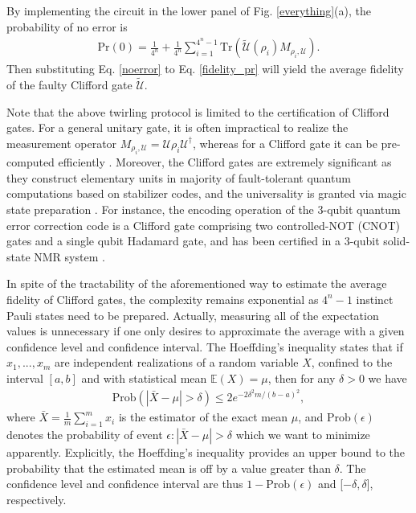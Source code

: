 \documentclass[prl,twocolumn,showpacs]{revtex4-1}
\begin{document}
By implementing the circuit in the lower panel of Fig. \ref{everything}(a), the probability of no error is \cite{Alex2013}
\begin{align} \label{noerror}
\text{Pr}(0) = \frac{1}{4^n} + \frac{1}{4^n}\sum_{i=1}^{4^n-1} \text{Tr}\left( \tilde{\mathcal{U}} \left( \rho_{i}\right) M_{\rho_i, \mathcal{U}}\right).
\end{align}
Then substituting Eq. \ref{noerror} to Eq. \ref{fidelity_pr} will yield the average fidelity of the faulty Clifford gate $\tilde{\mathcal{U}}$.

Note that the above twirling protocol is limited to the certification of Clifford gates. For a general unitary gate, it is often impractical to realize the measurement operator $M_{\rho_i, \mathcal{U}} = \mathcal{U} \rho_{i} \mathcal{U}^{\dagger}$, whereas for a Clifford gate it can be pre-computed efficiently \cite{Aaronson2004}. Moreover, the Clifford gates are extremely significant as they construct elementary units in majority of fault-tolerant quantum computations based on stabilizer codes, and the universality is granted via magic state preparation \cite{Bravyi2005,Souza2011}. For instance, the encoding operation of the 3-qubit quantum error correction code is a Clifford gate comprising two controlled-NOT (CNOT) gates and a single qubit Hadamard gate, and has been certified in a 3-qubit solid-state NMR system \cite{Moussa2012}.

In spite of the tractability of the aforementioned way to estimate the average fidelity of Clifford gates, the complexity remains exponential as $4^n-1$ instinct Pauli states need to be prepared. Actually, measuring all of the expectation values is unnecessary if one only desires to approximate the average with a given confidence level and confidence interval. The Hoeffding's inequality \cite{Venkatesh2012} states that if $x_1, . . . ,x_m$ are independent realizations of a random variable $X$, confined to the interval $[a, b]$ and with statistical mean $\mathbb{E}(X) = \mu$, then for any $\delta >0$ we have
\begin{align} \label{Hoeffding}
\text{Prob} \left( |\bar{X}-\mu| > \delta \right) \leq 2e^{-2\delta^2m/(b-a)^2},
\end{align}
where $\bar{X} = \frac{1}{m}\sum_{i=1}^m x_i$ is the estimator of the exact mean $\mu$, and $\text{Prob}(\epsilon)$ denotes the probability of event $\epsilon: |\bar{X}-\mu| > \delta$ which we want to minimize apparently. Explicitly, the Hoeffding's inequality provides an upper bound to the probability that the estimated mean is off by a value greater than $\delta$. The confidence level and confidence interval are thus $1-\text{Prob}(\epsilon)$ and [$-\delta, \delta$], respectively.
\end{document}
